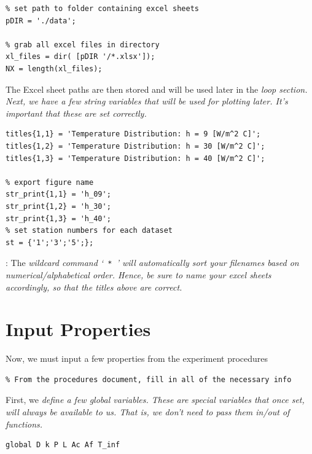 \documentclass[11pt, letterpaper]{article}
\begin{document}
\begin{minipage}{\linewidth}
\begin{lstlisting}[numbers=none]
%% SETUP
% set path to folder containing excel sheets
pDIR = './data';

% grab all excel files in directory
xl_files = dir( [pDIR '/*.xlsx']);
NX = length(xl_files);
\end{lstlisting}
\end{minipage}
\n
The Excel sheet paths are then stored and will be used later in the \it{loop} section. Next, we have a few \it{string} variables that will be used for plotting later. It's important that these are set correctly.

\begin{lstlisting}[numbers=none]
% plot title
titles{1,1} = 'Temperature Distribution: h = 9 [W/m^2 C]';
titles{1,2} = 'Temperature Distribution: h = 30 [W/m^2 C]';
titles{1,3} = 'Temperature Distribution: h = 40 [W/m^2 C]';

% export figure name
str_print{1,1} = 'h_09';
str_print{1,2} = 'h_30';
str_print{1,3} = 'h_40';
% set station numbers for each dataset
st = {'1';'3';'5';};
\end{lstlisting}
\n

\Note: The \it{wildcard} command `\texttt{ * }' will automatically sort your filenames based on numerical/alphabetical order. Hence, be sure to name your excel sheets accordingly, so that the titles above are correct.  

\section{Input Properties}

Now, we must input a few properties from the experiment procedures

\begin{lstlisting}[numbers=none]
%% =========== Part 1: Input Properties ============= 
% From the procedures document, fill in all of the necessary info
\end{lstlisting}

First, we \it{define} a few global variables. These are special variables that once set, will always be available to us. That is, we don't need to pass them in/out of functions.
\begin{lstlisting}[numbers=none]
% set globals
global D k P L Ac Af T_inf
\end{lstlisting}
\end{document}
